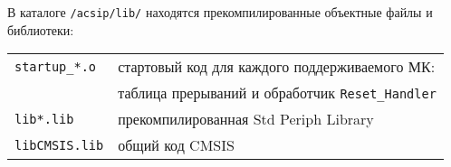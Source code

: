
В каталоге \verb|/acsip/lib/| находятся прекомпилированные объектные файлы и
библиотеки:

\begin{tabular}{l l}

\verb|startup_*.o| & стартовый код для каждого поддерживаемого МК:\\
& таблица прерываний и обработчик \verb|Reset_Handler|\\

\verb|lib*.lib| & прекомпилированная Std Periph Library \\
\verb|libCMSIS.lib| & общий код CMSIS \\

\end{tabular}

